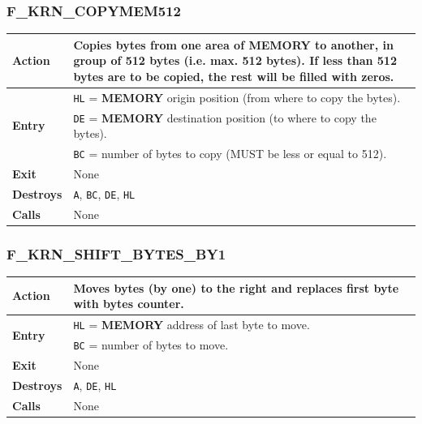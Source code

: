 \documentclass[a4paper,11pt]{article}
\begin{document}
        \subsubsection{F\_KRN\_COPYMEM512}
        \label{func:fkrncopymem512}
        \begin{tabular}{l p{9cm}}
            \hline\textbf{Action}
            & Copies bytes from one area of \textbf{MEMORY} to another, in group
            of 512 bytes (i.e. max. 512 bytes). If less than 512 bytes are to be
            copied, the rest will be filled with zeros.\\
            \hline\multirow[t]{3}{4em}{\textbf{Entry}}
            & \texttt{HL} = \textbf{MEMORY} origin position (from where to copy
            the bytes).\\
            & \texttt{DE} = \textbf{MEMORY} destination position (to where to
            copy the bytes).\\
            & \texttt{BC} = number of bytes to copy (MUST be less or equal to
            512).\\
            \hline\textbf{Exit} & None\\
            \hline\textbf{Destroys} & \texttt{A}, \texttt{BC}, \texttt{DE},
            \texttt{HL}\\
            \hline\textbf{Calls} & None\\
            \hline
        \end{tabular}

        \subsubsection{F\_KRN\_SHIFT\_BYTES\_BY1}
        \label{func:fkrnshiftbytesby1}
        \begin{tabular}{l p{9cm}}
            \hline\textbf{Action}
            & Moves bytes (by one) to the right and replaces first byte with
            bytes counter.\\
            \hline\multirow[t]{2}{4em}{\textbf{Entry}}
            & \texttt{HL} = \textbf{MEMORY} address of last byte to move.\\
            & \texttt{BC} = number of bytes to move.\\
            \hline\textbf{Exit} & None\\
            \hline\textbf{Destroys} & \texttt{A}, \texttt{DE}, \texttt{HL}\\
            \hline\textbf{Calls} & None\\
            \hline
        \end{tabular}
\end{document}
